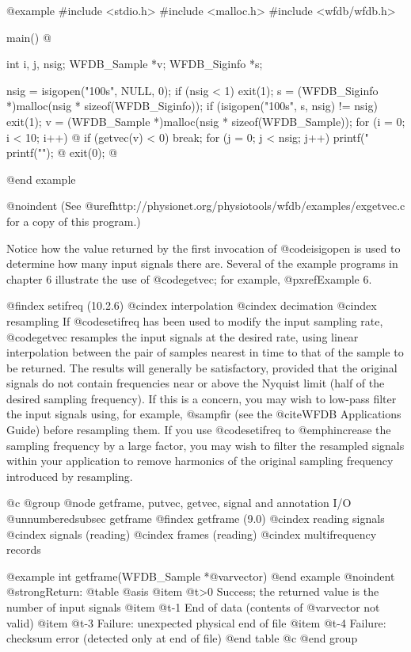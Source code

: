 {{{{{{{{@example
#include <stdio.h>
#include <malloc.h>
#include <wfdb/wfdb.h>

main()
@{
    int i, j, nsig;
    WFDB_Sample *v;
    WFDB_Siginfo *s;

    nsig = isigopen("100s", NULL, 0);
    if (nsig < 1)
        exit(1);
    s = (WFDB_Siginfo *)malloc(nsig * sizeof(WFDB_Siginfo));
    if (isigopen("100s", s, nsig) != nsig)
        exit(1);
    v = (WFDB_Sample *)malloc(nsig * sizeof(WFDB_Sample));
    for (i = 0; i < 10; i++) @{
        if (getvec(v) < 0)
            break;
        for (j = 0; j < nsig; j++)
            printf("%
        printf("\n");
    @}
    exit(0);
@}
@end example

@noindent
(See @uref{http://physionet.org/physiotools/wfdb/examples/exgetvec.c}
for a copy of this program.)

Notice how the value returned by the first invocation of @code{isigopen}
is used to determine how many input signals there are.  Several of the
example programs in chapter 6 illustrate the use of @code{getvec}; for
example, @pxref{Example 6}.

@findex setifreq (10.2.6)
@cindex interpolation
@cindex decimation
@cindex resampling
If @code{setifreq} has been used to modify the input sampling rate,
@code{getvec} resamples the input signals at the desired rate, using
linear interpolation between the pair of samples nearest in time to that
of the sample to be returned.  The results will generally be
satisfactory, provided that the original signals do not contain
frequencies near or above the Nyquist limit (half of the desired
sampling frequency).  If this is a concern, you may wish to low-pass
filter the input signals using, for example, @samp{fir} (see the
@cite{WFDB Applications Guide}) before resampling them.  If you use
@code{setifreq} to @emph{increase} the sampling frequency by a large
factor, you may wish to filter the resampled signals within your
application to remove harmonics of the original sampling frequency
introduced by resampling.

@c @group
@node    getframe, putvec, getvec, signal and annotation I/O
@unnumberedsubsec getframe
@findex getframe (9.0)
@cindex reading signals
@cindex signals (reading)
@cindex frames (reading)
@cindex multifrequency records

@example
int getframe(WFDB_Sample *@var{vector})
@end example
@noindent
@strong{Return:}
@table @asis
@item @t{>0}
Success;  the returned value is the number of input signals
@item @t{-1}
End of data (contents of @var{vector} not valid)
@item @t{-3}
Failure: unexpected physical end of file
@item @t{-4}
Failure: checksum error (detected only at end of file)
@end table
@c @end group

}}}}}}}}
